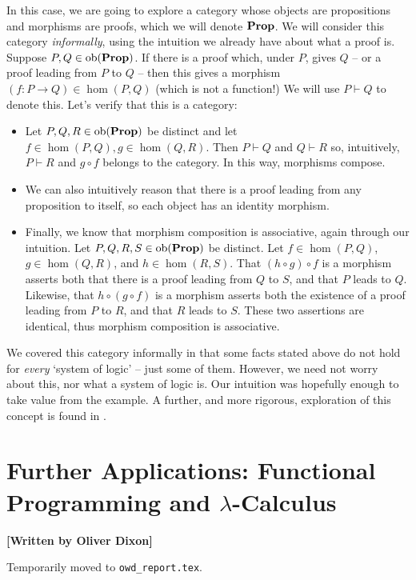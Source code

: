 \documentclass[10pt,a4paper,reqno]{amsart}
\numberwithin{figure}{section}
\begin{document}
In this case, we are going to explore a category whose objects are propositions and
morphisms are proofs, which we will denote $\operatorname{\mathbf{Prop}}$. We will consider this
category \emph{informally}, using the intuition we already have about what a proof is.
Suppose $P, Q \in \operatorname{ob} ( \operatorname{\mathbf{Prop}} )$. If there is a proof which, under $P$,
gives $Q$ -- or a proof leading from $P$ to $Q$ -- then this gives a morphism
$(f \colon P \to Q) \in \hom (P, Q)$ (which is not a function!) We will use
$P \vdash Q$ to denote this. Let's verify that this is a category:
\begin{itemize}
        \item Let $P, Q, R \in \operatorname{ob} ( \operatorname{\mathbf{Prop}} )$ be distinct and let
                $f \in \hom (P, Q), g \in \hom (Q, R)$. Then $P \vdash Q$ and
                $Q \vdash R$ so, intuitively, $P \vdash R$ and $g \circ f$ belongs
                to the category. In this way, morphisms compose.
        \item We can also intuitively reason that there is a proof leading from
                any proposition to itself, so each object has an identity
                morphism.
        \item Finally, we know that morphism composition is associative, again
                through our intuition. Let $P, Q, R, S \in \operatorname{ob} 
                ( \operatorname{\mathbf{Prop}} )$ be distinct. Let $f \in \hom (P, Q)$, $g \in
                \hom (Q, R)$, and $h \in \hom (R, S)$. That $(h \circ g) \circ f$
                is a morphism asserts both that there is a proof leading from $Q$ to $S$,
                and that $P$ leads to $Q$. Likewise, that $h \circ (g \circ f)$ is a morphism
                asserts both the existence of a proof leading from $P$ to $R$, and that $R$
                leads to $S$. These two assertions are identical, thus morphism
                composition is associative.
\end{itemize}
We covered this category informally in that some facts stated above do not hold
for \emph{every} `system of logic' -- just some of them. However, we need not
worry about this, nor what a system of logic is. Our intuition was hopefully enough
to take value from the example. A further, and more rigorous, exploration of
this concept is found in \autocite{Baez:2009}.

\section{Further Applications: %
        Functional Programming and \texorpdfstring{$\lambda$}{Lambda}-Calculus}
\begin{flushright}
        \textbf{[Written by Oliver Dixon]}
\end{flushright}

\noindent Temporarily moved to \texttt{owd\_report.tex}.
\end{document}
